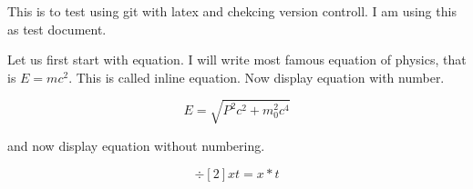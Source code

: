 \documentclass{article}
\begin{document}
This is to test using git with latex and chekcing version controll. 
I am using this as test document. 

Let us first start with equation. I will write most famous equation of physics, that is $E=mc^2$. This is called inline equation. Now display equation with number. 

\begin{equation}
E=\sqrt{P^2c^2+m_0^2c^4}
\end{equation}

and now display equation without numbering. 

\[
\div[2]{x}{t}=x*t
\]
\end{document}
